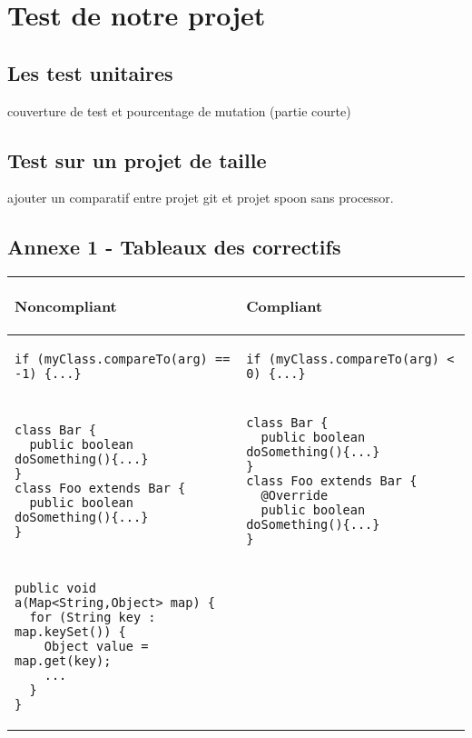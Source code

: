 \documentclass[a4paper]{article}
\begin{document}
\section{Test de notre projet}
\subsection{Les test unitaires}
couverture de test et pourcentage de mutation (partie courte)
\subsection{Test sur un projet de taille}
ajouter un comparatif entre projet git et projet spoon sans processor.
\newpage
\appendix
\begin{center}
	\section{Annexe 1 - Tableaux des correctifs}
	\begin{tabular}{|p{}|p{}|}
  	\hline
	  	\begin{center}
	  	 Noncompliant
	  	 \end{center} & 
	  	 \begin{center}
	  	 Compliant
	  	 \end{center} \\
  	\hline
	\begin{lstlisting}
if (myClass.compareTo(arg) == -1) {...}
  	\end{lstlisting} 
   	& 
   	\begin{lstlisting}
if (myClass.compareTo(arg) < 0) {...}
  	\end{lstlisting}  \\
  	\hline
	\begin{lstlisting}
class Bar {
  public boolean doSomething(){...}
}
class Foo extends Bar {
  public boolean doSomething(){...}
}
  	\end{lstlisting} 
   	& 
   	\begin{lstlisting}
class Bar {
  public boolean doSomething(){...}
}
class Foo extends Bar {
  @Override
  public boolean doSomething(){...}
}
  	\end{lstlisting}  \\
  	\hline
	\begin{lstlisting}
public void a(Map<String,Object> map) {
  for (String key : map.keySet()) {  
    Object value = map.get(key);
    ...
  }
}
  	\end{lstlisting} 
   	& 

\end{tabular}
\end{center}
\end{document}
